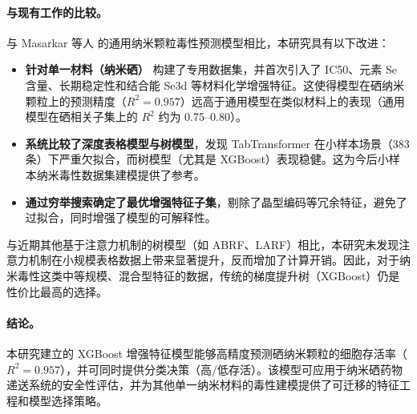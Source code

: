 \paragraph{与现有工作的比较。}
与 Masarkar 等人 \cite{masarkar2024} 的通用纳米颗粒毒性预测模型相比，本研究具有以下改进：
\begin{itemize}
  \item \textbf{针对单一材料（纳米硒）} 构建了专用数据集，并首次引入了 IC50、元素 Se 含量、长期稳定性和结合能 Se3d 等材料化学增强特征。这使得模型在硒纳米颗粒上的预测精度（$R^2=0.957$）远高于通用模型在类似材料上的表现（通用模型在硒相关子集上的 $R^2$ 约为 0.75--0.80）。
  \item \textbf{系统比较了深度表格模型与树模型}，发现 TabTransformer 在小样本场景（383 条）下严重欠拟合，而树模型（尤其是 XGBoost）表现稳健。这为今后小样本纳米毒性数据集建模提供了参考。
  \item \textbf{通过穷举搜索确定了最优增强特征子集}，剔除了晶型编码等冗余特征，避免了过拟合，同时增强了模型的可解释性。
\end{itemize}
与近期其他基于注意力机制的树模型（如 ABRF、LARF）相比，本研究未发现注意力机制在小规模表格数据上带来显著提升，反而增加了计算开销。因此，对于纳米毒性这类中等规模、混合型特征的数据，传统的梯度提升树（XGBoost）仍是性价比最高的选择。

\paragraph{结论。}
本研究建立的 XGBoost 增强特征模型能够高精度预测硒纳米颗粒的细胞存活率（$R^2=0.957$），并可同时提供分类决策（高/低存活）。该模型可应用于纳米硒药物递送系统的安全性评估，并为其他单一纳米材料的毒性建模提供了可迁移的特征工程和模型选择策略。
